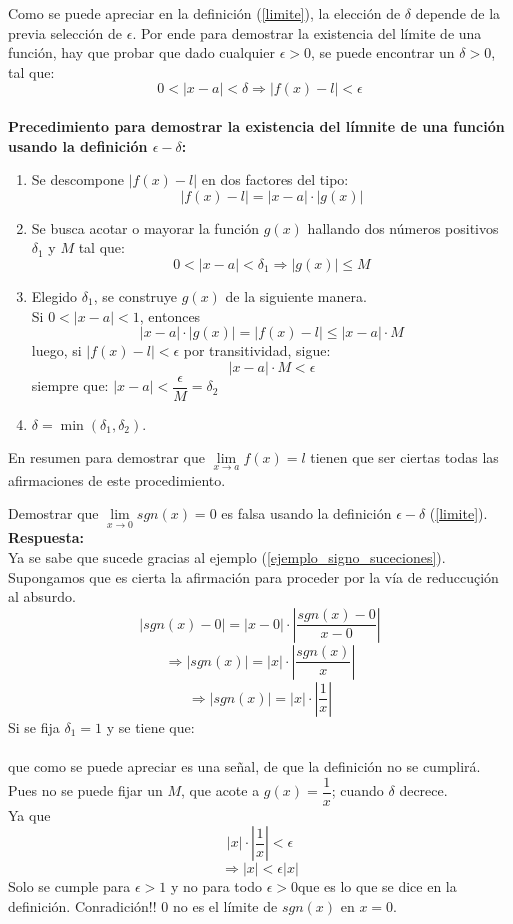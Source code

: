 \documentclass[10pt,twoside]{SelfArx} %
\begin{document}
Como se puede apreciar en la definición (\ref{limite}), la elección de $ \delta $ depende de la previa selección de $ \epsilon $. Por ende para demostrar la existencia del límite de una función, hay que probar que dado cualquier $ \epsilon>0 $, se puede encontrar un $ \delta>0 $, tal que:
\[ 	 0<|x-a|<\delta\Rightarrow |f(x)-l|<\epsilon  \]
\\
\textbf{Precedimiento para demostrar la existencia del límnite de una función usando la definición $ \epsilon-\delta $:}\\
\begin{enumerate}
	\item Se descompone $ |f(x)-l| $ en dos factores del tipo:
	\[ |f(x)-l|=|x-a|\cdot|g(x)| \]
	\item Se busca acotar o mayorar la funci\'on $ g(x) $ hallando dos números positivos $ \delta_{1} $ y $ M $ tal que:
	\[ 0<|x-a|<\delta_{1}\Rightarrow |g(x)|\leq M \]
	\item Elegido $ \delta_{1} $, se construye $ g(x) $ de la siguiente manera.\\
		Si $ 0<|x-a|<1 $, entonces 
		 \[ |x-a|\cdot|g(x)|=|f(x)-l|\leq|x-a|\cdot M \] 
		 luego, si $ |f(x)-l|<\epsilon $ por transitividad, sigue:
		 \[ |x-a|\cdot M<\epsilon \]
		 siempre que:
		 $ |x-a|<\dfrac{\epsilon}{M}=\delta_{2} $
		 
		 
		 \item $ \delta=\min(\delta_{1},\delta_{2} ) $.
\end{enumerate}
En resumen para demostrar que $ \lim\limits_{x\rightarrow a}f(x)=l $ tienen que ser ciertas todas las afirmaciones de este procedimiento.

\begin{ejemplo}
	Demostrar que $ \lim\limits_{x\rightarrow0}sgn(x)=0 $ es falsa usando la definici\'on $ \epsilon-\delta
	 $ (\ref{limite}).\\
	 \textbf{Respuesta:}\\
	 Ya se sabe que sucede gracias al ejemplo (\ref{ejemplo_signo_suceciones}). Supongamos que es cierta la afirmaci\'on para proceder por la vía de reduccuçión al absurdo.
	 \[ |sgn(x)-0|=|x-0|\cdot\left |\dfrac{sgn(x)-0}{x-0}\right |\]
	  \[ \Rightarrow |sgn(x)|=|x|\cdot\left |\dfrac{sgn(x)}{x}\right |\]
	  \[  \Rightarrow |sgn(x)|=|x|\cdot\left |\dfrac{1}{x}\right | \]
	  Si se fija $ \delta_{1}=1 $ y se tiene que:\\
	  
	  \\
	  que como se puede apreciar es una  señal, de que la definición no se cumplirá. Pues no se puede fijar un $ M $, que acote a $ g(x)=\dfrac{1}{x} $; cuando $ \delta 
	   $ decrece.\\
Ya que 	  
	  \[ |x|\cdot\left |\dfrac{1}{x}\right |<\epsilon \]
	  \[\Rightarrow |x|<\epsilon|x| \]
Solo se cumple para $ \epsilon>1 $ y no para todo $ \epsilon>0 $que es lo que se dice en la definición. Conradición!!
$ 0 $ no es el límite de $ sgn(x) $ en $ x=0 $.
\end{ejemplo}
\end{document}
